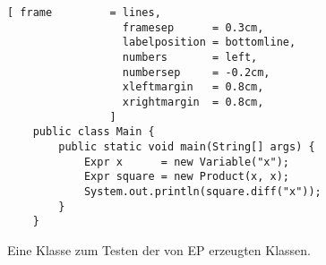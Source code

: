 \begin{figure}[!ht]
\centering
\begin{Verbatim}[ frame         = lines, 
                  framesep      = 0.3cm, 
                  labelposition = bottomline,
                  numbers       = left,
                  numbersep     = -0.2cm,
                  xleftmargin   = 0.8cm,
                  xrightmargin  = 0.8cm,
                ]
    public class Main {
        public static void main(String[] args) {
            Expr x      = new Variable("x");
            Expr square = new Product(x, x);
            System.out.println(square.diff("x"));
        }
    }
\end{Verbatim}
\vspace*{-0.3cm}
\caption{Eine Klasse zum Testen der von EP erzeugten Klassen.}
\label{fig:Main.java}
\end{figure}


